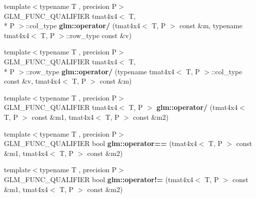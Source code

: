 \begin{DoxyCompactItemize}
\item 
\hypertarget{namespaceglm_ac86c24a679ceb1c0588e0cd9fa31df3d}{{\footnotesize template$<$typename T , precision P$>$ }\\G\-L\-M\-\_\-\-F\-U\-N\-C\-\_\-\-Q\-U\-A\-L\-I\-F\-I\-E\-R tmat4x4$<$ T, \\*
P $>$\-::col\-\_\-type {\bfseries glm\-::operator/} (tmat4x4$<$ T, P $>$ const \&m, typename tmat4x4$<$ T, P $>$\-::row\-\_\-type const \&v)}\label{namespaceglm_ac86c24a679ceb1c0588e0cd9fa31df3d}

\item 
\hypertarget{namespaceglm_af41edbb529eca615b9f65e625fae2bab}{{\footnotesize template$<$typename T , precision P$>$ }\\G\-L\-M\-\_\-\-F\-U\-N\-C\-\_\-\-Q\-U\-A\-L\-I\-F\-I\-E\-R tmat4x4$<$ T, \\*
P $>$\-::row\-\_\-type {\bfseries glm\-::operator/} (typename tmat4x4$<$ T, P $>$\-::col\-\_\-type const \&v, tmat4x4$<$ T, P $>$ const \&m)}\label{namespaceglm_af41edbb529eca615b9f65e625fae2bab}

\item 
\hypertarget{namespaceglm_a53cc97cdb468d042fd35bfd46d35fbc0}{{\footnotesize template$<$typename T , precision P$>$ }\\G\-L\-M\-\_\-\-F\-U\-N\-C\-\_\-\-Q\-U\-A\-L\-I\-F\-I\-E\-R tmat4x4$<$ T, P $>$ {\bfseries glm\-::operator/} (tmat4x4$<$ T, P $>$ const \&m1, tmat4x4$<$ T, P $>$ const \&m2)}\label{namespaceglm_a53cc97cdb468d042fd35bfd46d35fbc0}

\item 
\hypertarget{namespaceglm_a4a5a52bd72d27f2659923dcac3a41bd9}{{\footnotesize template$<$typename T , precision P$>$ }\\G\-L\-M\-\_\-\-F\-U\-N\-C\-\_\-\-Q\-U\-A\-L\-I\-F\-I\-E\-R bool {\bfseries glm\-::operator==} (tmat4x4$<$ T, P $>$ const \&m1, tmat4x4$<$ T, P $>$ const \&m2)}\label{namespaceglm_a4a5a52bd72d27f2659923dcac3a41bd9}

\item 
\hypertarget{namespaceglm_a4f307dd12855db67708f7198042f419e}{{\footnotesize template$<$typename T , precision P$>$ }\\G\-L\-M\-\_\-\-F\-U\-N\-C\-\_\-\-Q\-U\-A\-L\-I\-F\-I\-E\-R bool {\bfseries glm\-::operator!=} (tmat4x4$<$ T, P $>$ const \&m1, tmat4x4$<$ T, P $>$ const \&m2)}\label{namespaceglm_a4f307dd12855db67708f7198042f419e}

\end{DoxyCompactItemize}


